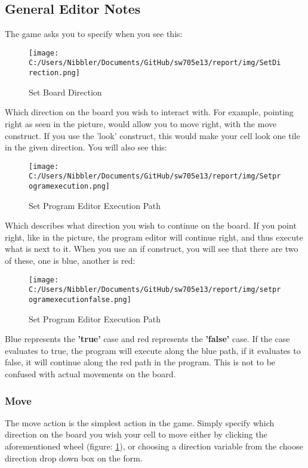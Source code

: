 \documentclass[12pt]{article}
\begin{document}
\subsection{General Editor Notes}

The game asks you to specify when you see this:

\begin{figure}[h]
	\centering
		\texttt{[image: C:/Users/Nibbler/Documents/GitHub/sw705e13/report/img/SetDirection.png]}
	\caption{Set Board Direction}
	\label{fig:SetDirection}
\end{figure}

Which direction on the board you wish to interact with. For example, pointing right as seen in the picture, would allow you to move right, with the move construct. If you use the 'look' construct, this would make your cell look one tile in the given direction. You will also see this:

\begin{figure}[h]
	\centering
		\texttt{[image: C:/Users/Nibbler/Documents/GitHub/sw705e13/report/img/Setprogramexecution.png]}
	\caption{Set Program Editor Execution Path}
	\label{fig:Setprogramexecution}
\end{figure}

Which describes what direction you wish to continue on the board. If you point right, like in the picture, the program editor will continue right, and thus execute what is next to it. When you use an if construct, you will see that there are two of these, one is blue, another is red:


\begin{figure}[h]
	\centering
		\texttt{[image: C:/Users/Nibbler/Documents/GitHub/sw705e13/report/img/setprogramexecutionfalse.png]}
	\caption{Set Program Editor Execution Path}
	\label{fig:setprogramexecutionfalse}
\end{figure}

Blue represents the \textbf{'true'} case and red represents the \textbf{'false'} case. If the case evaluates to true, the program will execute along the blue path, if it evaluates to false, it will continue along the red path in the program. This is not to be confused with actual movements on the board.

\subsubsection{Move}

The move action is the simplest action in the game. Simply specify which direction on the board you wish your cell to move either by clicking the aforementioned wheel (figure: \ref{fig:SetDirection}), or choosing a direction variable from the choose direction drop down box on the form.
\end{document}
